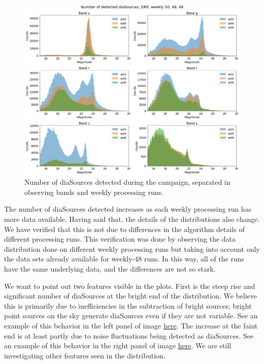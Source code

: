 \begin{figure}
  \includegraphics[width=\textwidth]{dia/figures/diaSources.png}
  \caption{Number of diaSources detected during the campaign, separated in observing bands and weekly processing runs.}
  \label{fig:diaSrc_count}
\end{figure}

The number of diaSources detected increases as each weekly processing run has more data available. Having said that, the details of the distributions also change. We have verified that this is not due to differences in the algorithm details of different processing runs. This verification was done by observing the data distribution done on different weekly processing runs but taking into account only the data sets already available for weekly-48 runs. In this way, all of the runs have the same underlying data, and the differences are not so stark. \par

We want to point out two features visible in the plots. First is the steep rise and significant number of diaSources at the bright end of the distribution. We believe this is primarily due to inefficiencies in the subtraction of bright sources; bright point sources on the sky generate diaSources even if they are not variable. See an example of this behavior in the left panel of image \href{https://rubin-obs.slack.com/archives/C07QM71SZ5J/p1734564452594809?thread_ts=1734547527.434299&cid=C07QM71SZ5J}{here}.
The increase at the faint end is at least partly due to noise fluctuations being detected as diaSources. See an example of this behavior in the right panel of image \href{https://rubin-obs.slack.com/archives/C07QM71SZ5J/p1734564452594809?thread_ts=1734547527.434299&cid=C07QM71SZ5J}{here}. We are still investigating other features seen in the distribution. \par

